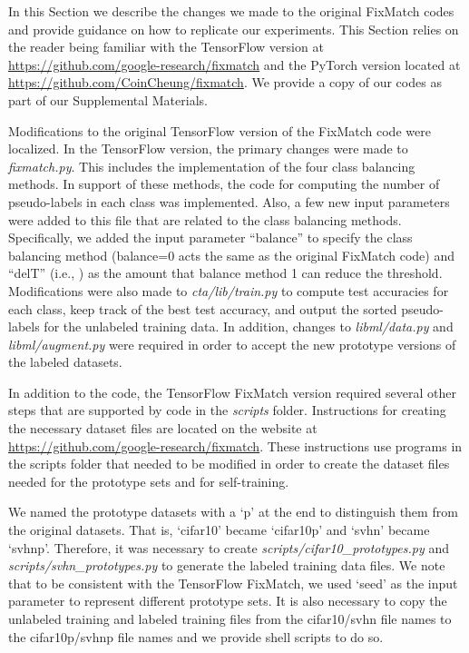 \documentclass[final]{cvpr}
\begin{document}
In this Section we describe the changes we made to the original FixMatch codes and provide guidance on how to replicate our experiments.  This Section relies on the reader being familiar with the TensorFlow version at \url{https://github.com/google-research/fixmatch} and the PyTorch version located at \url{https://github.com/CoinCheung/fixmatch}.  We provide a copy of our codes as part of our Supplemental Materials.

Modifications to the original TensorFlow version of the FixMatch code were localized.
In the TensorFlow version, the primary changes were made to \emph{fixmatch.py}.
This includes the implementation of the four class balancing methods.
In support of these methods, the code for computing the number of pseudo-labels in each class was implemented.
Also, a few new input parameters were added to this file that are related to the class balancing methods.
Specifically, we added the input parameter ``balance'' to specify the class balancing method (balance=0 acts the same as the original FixMatch code) and ``delT'' (i.e., ) as the amount that balance method 1 can reduce the threshold.
Modifications were also made to \emph{cta/lib/train.py} to compute test accuracies for each class, keep track of the best test accuracy, and output the sorted pseudo-labels for the unlabeled training data.
In addition, changes to \emph{libml/data.py} and \emph{libml/augment.py} were required in order to accept the new prototype versions of the labeled datasets.

In addition to the code, the TensorFlow FixMatch version required several other steps that are supported by code in the \emph{scripts} folder.
Instructions for creating the necessary dataset files are located on the website at \url{https://github.com/google-research/fixmatch}.
These instructions use programs in the scripts folder that needed to be modified in order to create the dataset files needed for the prototype sets and for self-training.

We named the prototype datasets with a `p' at the end to distinguish them from the original datasets.
That is, `cifar10' became `cifar10p' and `svhn' became `svhnp'.
Therefore, it was necessary to create \emph{scripts/cifar10\_prototypes.py} and \emph{scripts/svhn\_prototypes.py} to generate the labeled training data files.
We note that to be consistent with the TensorFlow FixMatch, we used `seed' as the input parameter to represent different prototype sets.
It is also necessary to copy the unlabeled training and labeled training files from the cifar10/svhn file names to the cifar10p/svhnp file names and we provide shell scripts to do so.
\end{document}
